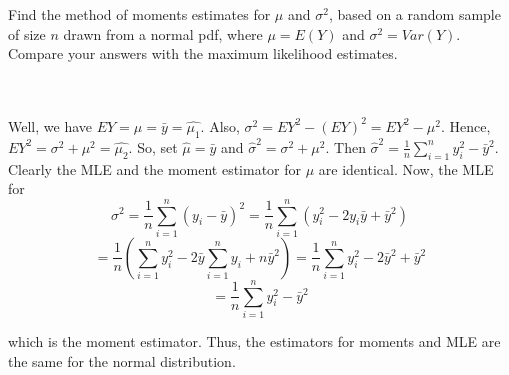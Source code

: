Find the method of moments estimates for $\mu$ and $\sigma^2$, based on a random sample of size $n$
drawn from a normal pdf, where $\mu=E(Y)$ and $\sigma^2=Var(Y)$. Compare your answers with the maximum
likelihood estimates.\\\\

\begin{solution}\renewcommand{\qedsymbol}{}\ \\
    Well, we have $EY=\mu=\bar{y}=\hat{\mu_1}$. Also, $\sigma^2=EY^2-(EY)^2=EY^2-\mu^2$. Hence,
    $EY^2=\sigma^2+\mu^2=\hat{\mu_2}$. So, set $\hat{\mu}=\bar{y}$ and $\hat{\sigma}^2=\sigma^2+\mu^2$.
    Then $\hat{\sigma}^2=\frac1n\sum_{i=1}^ny_i^2-\bar{y}^2$. Clearly the MLE and the moment estimator
    for $\mu$ are identical. Now, the MLE for
    $$\sigma^2=\frac1n\sum_{i=1}^n(y_i-\bar{y})^2=\frac1n\sum_{i=1}^n(y_i^2-2y_i\bar{y}+\bar{y}^2)$$
    $$=\frac1n(\sum_{i=1}^ny_i^2-2\bar{y}\sum_{i=1}^ny_i+n\bar{y}^2)
    =\frac1n\sum_{i=1}^ny_i^2-2\bar{y}^2+\bar{y}^2$$
    $$=\frac1n\sum_{i=1}^ny_i^2-\bar{y}^2$$
    
    which is the moment estimator. Thus, the estimators for moments and MLE are the same for the normal
    distribution.

\end{solution}